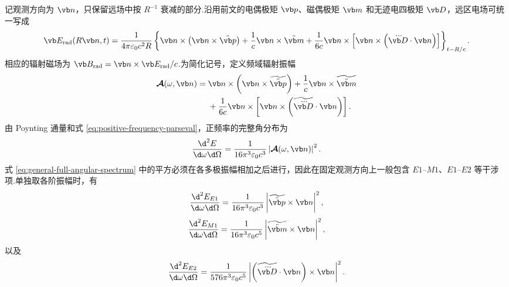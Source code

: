 记观测方向为 $\vb n$，只保留远场中按 $R^{-1}$ 衰减的部分.沿用前文的电偶极矩 $\vb p$、磁偶极矩 $\vb m$ 和无迹电四极矩 $\vb D$，远区电场可统一写成
\begin{equation}
 \vb E_{\mathrm{rad}}(R\vb n,t)
 =\frac{1}{4\pi\varepsilon_0c^2R}
 \left\{
 \vb n\times\left(\vb n\times\ddot{\vb p}\right)
 +\frac{1}{c}\vb n\times\ddot{\vb m}
 +\frac{1}{6c}\vb n\times
 \left[\vb n\times\left(\dddot{\vb D}\cdot\vb n\right)\right]
 \right\}_{t-R/c}.
 \label{eq:general-far-zone-multipole-field-frequency-section}
\end{equation}
相应的辐射磁场为 $\vb B_{\mathrm{rad}}=\vb n\times\vb E_{\mathrm{rad}}/c$.为简化记号，定义频域辐射振幅
\begin{equation}
 \begin{aligned}
 \boldsymbol{\mathcal A}(\omega,\vb n)={}&
 \vb n\times\left(\vb n\times\widetilde{\ddot{\vb p}}\right)
 +\frac{1}{c}\vb n\times\widetilde{\ddot{\vb m}}\\
 &+\frac{1}{6c}\vb n\times
 \left[\vb n\times\left(\widetilde{\dddot{\vb D}}\cdot\vb n\right)\right].
 \end{aligned}
 \label{eq:general-frequency-radiation-amplitude}
\end{equation}
由 Poynting 通量和式 \eqref{eq:positive-frequency-parseval}，正频率的完整角分布为
\begin{equation}
 \frac{\d^2E}{\d\omega\d\Omega}
 =\frac{1}{16\pi^3\varepsilon_0c^3}
 \left|\boldsymbol{\mathcal A}(\omega,\vb n)\right|^2.
 \label{eq:general-full-angular-spectrum}
\end{equation}
式 \eqref{eq:general-full-angular-spectrum} 中的平方必须在各多极振幅相加之后进行，因此在固定观测方向上一般包含 $E1$--$M1$、$E1$--$E2$ 等干涉项.单独取各阶振幅时，有
\begin{equation}
 \frac{\d^2E_{E1}}{\d\omega\d\Omega}
 =\frac{1}{16\pi^3\varepsilon_0c^3}
 \left|\widetilde{\ddot{\vb p}}\times\vb n\right|^2,
 \label{eq:general-E1-angular-spectrum}
\end{equation}
\begin{equation}
 \frac{\d^2E_{M1}}{\d\omega\d\Omega}
 =\frac{1}{16\pi^3\varepsilon_0c^5}
 \left|\widetilde{\ddot{\vb m}}\times\vb n\right|^2,
 \label{eq:general-M1-angular-spectrum}
\end{equation}
以及
\begin{equation}
 \frac{\d^2E_{E2}}{\d\omega\d\Omega}
 =\frac{1}{576\pi^3\varepsilon_0c^5}
 \left|\left(\widetilde{\dddot{\vb D}}\cdot\vb n\right)\times\vb n\right|^2.
 \label{eq:general-E2-angular-spectrum}
\end{equation}

